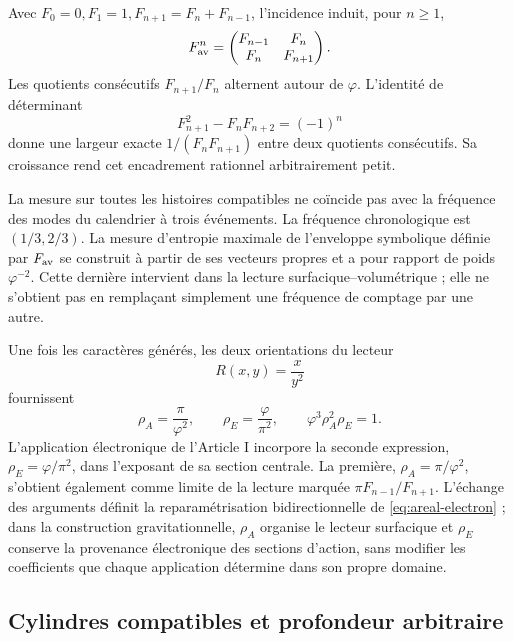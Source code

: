 Avec \(F_0=0,F_1=1,F_{n+1}=F_n+F_{n-1}\), l'incidence induit, pour \(n\geq1\),
\[
 F_{\rm av}^n=\begin{pmatrix}F_{n-1}&F_n\\F_n&F_{n+1}\end{pmatrix}.
\]
Les quotients consécutifs \(F_{n+1}/F_n\) alternent autour de \(\varphi\). L'identité de déterminant
\[
 F_{n+1}^2-F_nF_{n+2}=(-1)^n
\]
donne une largeur exacte \(1/(F_nF_{n+1})\) entre deux quotients consécutifs. Sa croissance rend cet encadrement rationnel arbitrairement petit.

La mesure sur toutes les histoires compatibles ne coïncide pas avec la fréquence des modes du calendrier à trois événements. La fréquence chronologique est \((1/3,2/3)\). La mesure d'entropie maximale de l'enveloppe symbolique définie par \(F_{\rm av}\) se construit à partir de ses vecteurs propres et a pour rapport de poids \(\varphi^{-2}\). Cette dernière intervient dans la lecture surfacique--volumétrique ; elle ne s'obtient pas en remplaçant simplement une fréquence de comptage par une autre.

Une fois les caractères générés, les deux orientations du lecteur
\[
 R(x,y)=\frac{x}{y^2}
\]
fournissent
\begin{equation}
 \rho_A=\frac\pi{\varphi^2},\qquad
 \rho_E=\frac\varphi{\pi^2},\qquad
 \varphi^3\rho_A^2\rho_E=1.
 \label{eq:areal-electron}
\end{equation}
L'application électronique de l'Article I incorpore la seconde expression,
\(\rho_E=\varphi/\pi^2\), dans l'exposant de sa section centrale. La première,
\(\rho_A=\pi/\varphi^2\), s'obtient également comme limite de la lecture
marquée \(\pi F_{n-1}/F_{n+1}\). L'échange des arguments définit la
reparamétrisation bidirectionnelle de \eqref{eq:areal-electron} ; dans la
construction gravitationnelle, \(\rho_A\) organise le lecteur surfacique et \(\rho_E\)
conserve la provenance électronique des sections d'action, sans modifier
les coefficients que chaque application détermine dans son propre domaine.



\subsection{Cylindres compatibles et profondeur arbitraire}

